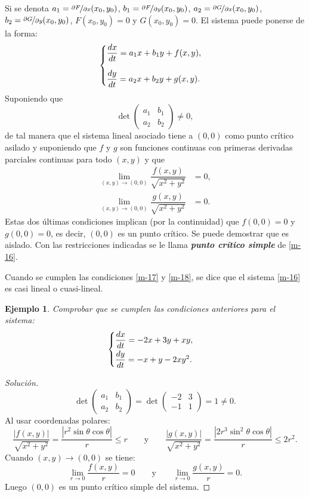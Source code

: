 \documentclass[a5paper,doc,10pt,noapacite]{apa6}
\newcommand{\yds}{\qquad\text{y}\qquad}
\newtheorem{ejem}{Ejemplo}
\begin{document}
{{Si se denota \(a_1=\nicefrac{\partial F}{\partial x}(x_0,y_0)\), \(b_1=\nicefrac{\partial F}{\partial y}(x_0,y_0)\), \(a_2=\nicefrac{\partial G}{\partial x}(x_0,y_0)\), \(b_2=\nicefrac{\partial G}{\partial y}(x_0,y_0)\), \(F(x_0,y_0)=0\) y \(G(x_0,y_0)=0\). El sistema puede ponerse de la forma:
\begin{equation}\label{m-16}
	\begin{cases}
		\dfrac{dx}{dt}= a_1x+b_1 y+f(x,y),	\vspace{0.3em}
		\\[1em]
		\dfrac{dy}{dt}= a_2 x+b_2 y+g(x,y).
	\end{cases}
\end{equation}
Suponiendo que
\begin{equation}\label{m-17}
	\det\begin{pmatrix} a_1 & b_1 \\ a_2 & b_2 \end{pmatrix} \neq 0,
\end{equation}
de tal manera que el sistema lineal asociado tiene a \((0,0)\) como punto crítico asilado y suponiendo que \(f\) y \(g\) son funciones continuas con primeras derivadas parciales continuas para todo \((x,y)\) y que
\begin{align}\label{m-18}
	\lim_{(x,y)\to(0,0)}\dfrac{f(x,y)}{\sqrt{x^2+y^2}} &= 0,
	\\
	\lim_{(x,y)\to(0,0)}\dfrac{g(x,y)}{\sqrt{x^2+y^2}}&= 0.
\end{align}
Estas dos últimas condiciones implican (por la continuidad) que \(f(0,0)=0\) y \(g(0,0)=0\), es decir, \((0,0)\) es un punto crítico. Se puede demostrar que es aislado. Con las restricciones indicadas se le llama \emph{\textbf{punto crítico simple}} de \eqref{m-16}.

Cuando se cumplen las condiciones \eqref{m-17} y \eqref{m-18}, se dice que  el sistema \eqref{m-16} es casi lineal o cuasi-lineal.

\begin{ejem}
	Comprobar que se cumplen las condiciones anteriores para el sistema:
	\[
	\begin{cases}
		\dfrac{dx}{dt}= -2x+3y+xy,	\vspace{0.3em}
		\\
		\dfrac{dy}{dt}= -x+y-2xy^2.
	\end{cases}
	\]
\end{ejem}
\begin{proof}[Solución]
		\[
		\det\begin{pmatrix} a_1 & b_1 \\ a_2 & b_2 \end{pmatrix}=\det\begin{pmatrix} -2 & 3 \\ -1 & 1 \end{pmatrix}=1\neq 0.
		\]
		Al usar coordenadas polares:
		\[
			\dfrac{|f(x,y)|}{\sqrt{x^2+y^2}}=\dfrac{|r^2\sin\theta\cos\theta|}{r}\leq r
			\yds
			\dfrac{|g(x,y)|}{\sqrt{x^2+y^2}}=\dfrac{|2r^3\sin^2\theta\cos\theta|}{r}\leq 2r^2.
		\]
		Cuando \((x,y)\to (0,0)\) se tiene:
		\[
			\lim_{r\to 0}\dfrac{f(x,y)}{r} = 0 \yds
			\lim_{r\to 0}\dfrac{g(x,y)}{r}=0.
		\]
		Luego \((0,0)\) es un punto crítico simple del sistema.
\end{proof}

}}
\end{document}
